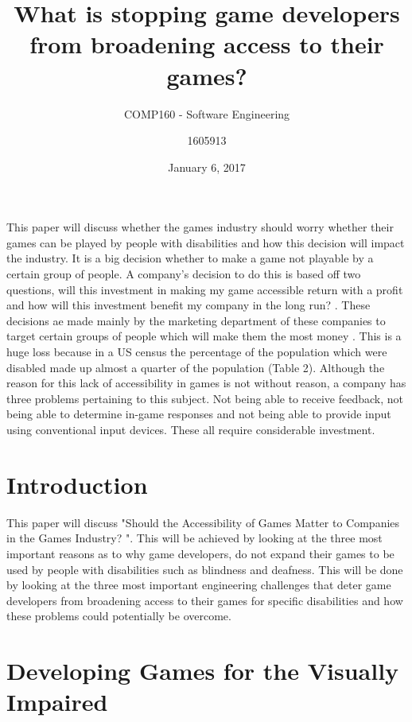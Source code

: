 \documentclass[11pt]{scrartcl}
\title{What is stopping game developers from broadening access to their games? }
\date{January 6, 2017}
\subtitle{COMP160 - Software Engineering}
\author{1605913}
\begin{document}
\maketitle


This paper will discuss whether the games industry should worry whether their games can be played by people with disabilities and how this decision will impact the industry. It is a big decision whether to make a game not playable by a certain group of people. A company’s decision to do this is based off two questions, will this investment in making my game accessible return with a profit and how will this investment benefit my company in the long run? \cite{bierre2005game}. These decisions ae made mainly by the marketing department of these companies to target certain groups of people which will make them the most money \cite{kalapanidas2009playmancer}. This is a huge loss because in a US census the percentage of the population which were disabled made up almost a quarter of the population\cite{bierre2005game} (Table 2). Although the reason for this lack of accessibility in games is not without reason, a company has three problems pertaining to this subject. Not being able to receive feedback, not being able to determine in-game responses and not being able to provide input using conventional input devices. These all require considerable investment\cite{yuan2011game}.

\section{Introduction}

This paper will discuss "Should the Accessibility of Games Matter to Companies in the Games Industry? ". This will be achieved by looking at the three most important reasons as to why game developers, do not expand their games to be used by people with disabilities such as blindness and deafness. This will be done by looking at the three most important engineering challenges that deter game developers from broadening access to their games for specific disabilities and how these problems could potentially be overcome.

\section{Developing Games for the Visually Impaired}
\end{document}
